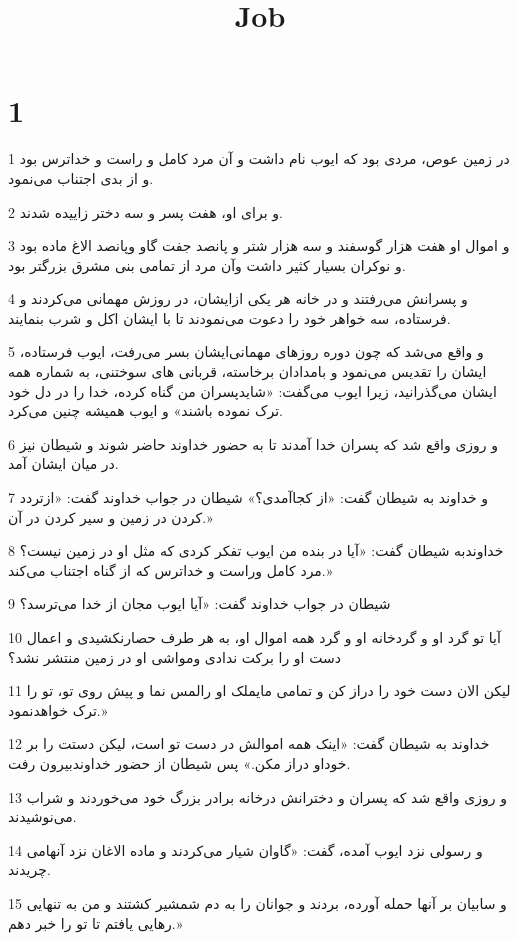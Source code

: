 

\title{Job}

 
\chapter{1}

\par 1 در زمین عوص، مردی بود که ایوب نام داشت و آن مرد کامل و راست و خداترس بود و از بدی اجتناب می‌نمود.
\par 2 و برای او، هفت پسر و سه دختر زاییده شدند.
\par 3 و اموال او هفت هزار گوسفند و سه هزار شتر و پانصد جفت گاو وپانصد الاغ ماده بود و نوکران بسیار کثیر داشت وآن مرد از تمامی بنی مشرق بزرگتر بود.
\par 4 و پسرانش می‌رفتند و در خانه هر یکی ازایشان، در روزش مهمانی می‌کردند و فرستاده، سه خواهر خود را دعوت می‌نمودند تا با ایشان اکل و شرب بنمایند.
\par 5 و واقع می‌شد که چون دوره روزهای مهمانی‌ایشان بسر می‌رفت، ایوب فرستاده، ایشان را تقدیس می‌نمود و بامدادان برخاسته، قربانی های سوختنی، به شماره همه ایشان می‌گذرانید، زیرا ایوب می‌گفت: «شایدپسران من گناه کرده، خدا را در دل خود ترک نموده باشند» و ایوب همیشه چنین می‌کرد.
\par 6 و روزی واقع شد که پسران خدا آمدند تا به حضور خداوند حاضر شوند و شیطان نیز در میان ایشان آمد.
\par 7 و خداوند به شیطان گفت: «از کجاآمدی؟» شیطان در جواب خداوند گفت: «ازتردد کردن در زمین و سیر کردن در آن.»
\par 8 خداوندبه شیطان گفت: «آیا در بنده من ایوب تفکر کردی که مثل او در زمین نیست؟ مرد کامل وراست و خداترس که از گناه اجتناب می‌کند.»
\par 9 شیطان در جواب خداوند گفت: «آیا ایوب مجان از خدا می‌ترسد؟
\par 10 آیا تو گرد او و گردخانه او و گرد همه اموال او، به هر طرف حصارنکشیدی و اعمال دست او را برکت ندادی ومواشی او در زمین منتشر نشد؟
\par 11 لیکن الان دست خود را دراز کن و تمامی مایملک او رالمس نما و پیش روی تو، تو را ترک خواهدنمود.»
\par 12 خداوند به شیطان گفت: «اینک همه اموالش در دست تو است، لیکن دستت را بر خوداو دراز مکن.» پس شیطان از حضور خداوندبیرون رفت.
\par 13 و روزی واقع شد که پسران و دخترانش درخانه برادر بزرگ خود می‌خوردند و شراب می‌نوشیدند.
\par 14 و رسولی نزد ایوب آمده، گفت: «گاوان شیار می‌کردند و ماده الاغان نزد آنهامی چریدند.
\par 15 و سابیان بر آنها حمله آورده، بردند و جوانان را به دم شمشیر کشتند و من به تنهایی رهایی یافتم تا تو را خبر دهم.»
